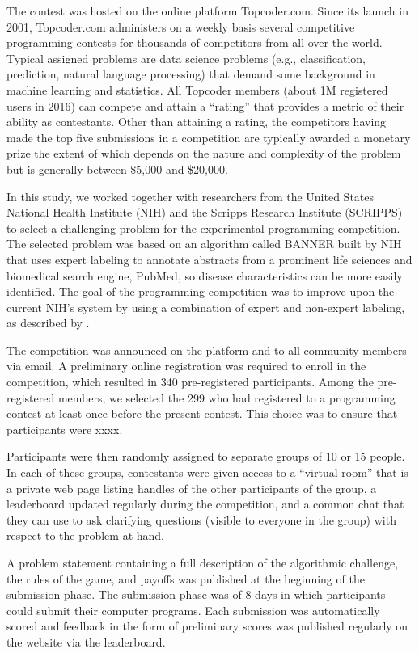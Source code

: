 \documentclass[12pt,]{article}
\begin{document}
The contest was hosted on the online platform Topcoder.com. Since its
launch in 2001, Topcoder.com administers on a weekly basis several
competitive programming contests for thousands of competitors from all
over the world. Typical assigned problems are data science problems
(e.g., classification, prediction, natural language processing) that
demand some background in machine learning and statistics. All Topcoder
members (about 1M registered users in 2016) can compete and attain a
``rating'' that provides a metric of their ability as contestants. Other
than attaining a rating, the competitors having made the top five
submissions in a competition are typically awarded a monetary prize the
extent of which depends on the nature and complexity of the problem but
is generally between \$5,000 and \$20,000.

In this study, we worked together with researchers from the United
States National Health Institute (NIH) and the Scripps Research
Institute (SCRIPPS) to select a challenging problem for the experimental
programming competition. The selected problem was based on an algorithm
called BANNER built by NIH \citep{leaman2008banner} that uses expert
labeling to annotate abstracts from a prominent life sciences and
biomedical search engine, PubMed, so disease characteristics can be more
easily identified. The goal of the programming competition was to
improve upon the current NIH's system by using a combination of expert
and non-expert labeling, as described by \citet{good2014microtask}.

The competition was announced on the platform and to all community
members via email. A preliminary online registration was required to
enroll in the competition, which resulted in 340 pre-registered
participants. Among the pre-registered members, we selected the 299 who
had registered to a programming contest at least once before the present
contest. This choice was to ensure that participants were xxxx.

Participants were then randomly assigned to separate groups of 10 or 15
people. In each of these groups, contestants were given access to a
``virtual room'' that is a private web page listing handles of the other
participants of the group, a leaderboard updated regularly during the
competition, and a common chat that they can use to ask clarifying
questions (visible to everyone in the group) with respect to the problem
at hand.

A problem statement containing a full description of the algorithmic
challenge, the rules of the game, and payoffs was published at the
beginning of the submission phase. The submission phase was of 8 days in
which participants could submit their computer programs. Each submission
was automatically scored and feedback in the form of preliminary scores
was published regularly on the website via the leaderboard.
\end{document}
